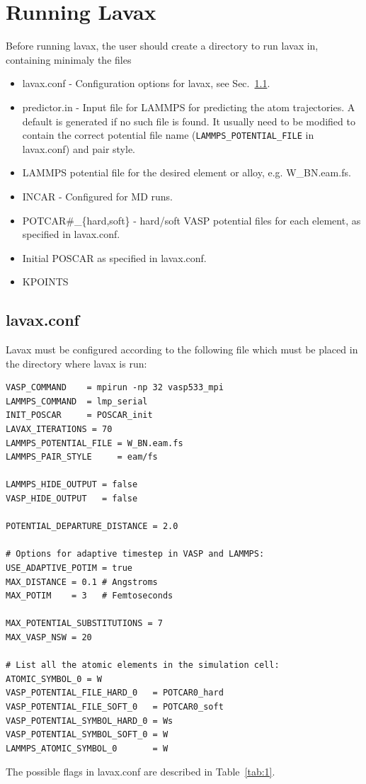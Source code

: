 \documentclass{article}
\begin{document}
\section{Running Lavax}
Before running lavax, the user should create a directory to run lavax in, containing minimaly the files
\begin{itemize}
\item lavax.conf - Configuration options for lavax, see Sec.~\ref{sec:lavax_conf}.
\item predictor.in - Input file for LAMMPS for predicting the atom trajectories. A default is generated if no such file is found. It usually need to be modified to contain the correct potential file name (\texttt{LAMMPS\_POTENTIAL\_FILE} in lavax.conf) and pair style.
\item LAMMPS potential file for the desired element or alloy, e.g. W\_BN.eam.fs.
\item INCAR - Configured for MD runs.
\item POTCAR\#\_\{hard,soft\} - hard/soft VASP potential files for each element, as specified in lavax.conf.
\item Initial POSCAR as specified in lavax.conf.
\item KPOINTS
\end{itemize}

\newpage
\subsection{lavax.conf}
\label{sec:lavax_conf}
Lavax must be configured according to the following file which must be placed in the directory where lavax is run:
\begin{verbatim}
VASP_COMMAND    = mpirun -np 32 vasp533_mpi
LAMMPS_COMMAND  = lmp_serial
INIT_POSCAR     = POSCAR_init
LAVAX_ITERATIONS = 70
LAMMPS_POTENTIAL_FILE = W_BN.eam.fs
LAMMPS_PAIR_STYLE     = eam/fs

LAMMPS_HIDE_OUTPUT = false
VASP_HIDE_OUTPUT   = false

POTENTIAL_DEPARTURE_DISTANCE = 2.0

# Options for adaptive timestep in VASP and LAMMPS:
USE_ADAPTIVE_POTIM = true
MAX_DISTANCE = 0.1 # Angstroms
MAX_POTIM    = 3   # Femtoseconds

MAX_POTENTIAL_SUBSTITUTIONS = 7
MAX_VASP_NSW = 20

# List all the atomic elements in the simulation cell:
ATOMIC_SYMBOL_0 = W
VASP_POTENTIAL_FILE_HARD_0   = POTCAR0_hard
VASP_POTENTIAL_FILE_SOFT_0   = POTCAR0_soft
VASP_POTENTIAL_SYMBOL_HARD_0 = Ws
VASP_POTENTIAL_SYMBOL_SOFT_0 = W
LAMMPS_ATOMIC_SYMBOL_0       = W
\end{verbatim}
The possible flags in lavax.conf are described in Table~\ref{tab:1}.
\end{document}
